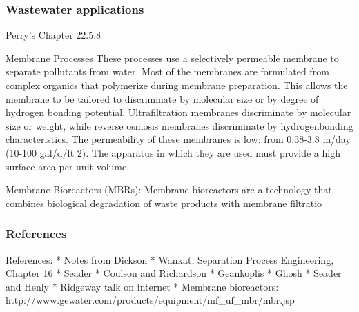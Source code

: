 \begin{frame}\frametitle{Wastewater applications}
	Perry's Chapter 22.5.8
	
	Membrane Processes These processes use a selectively permeable membrane to separate pollutants from water. Most of the membranes are formulated from complex organics that polymerize during membrane preparation. This allows the membrane to be tailored to discriminate by molecular size or by degree of hydrogen bonding potential. Ultrafiltration membranes discriminate by molecular size or weight, while reverse osmosis membranes discriminate by hydrogenbonding characteristics. The permeability of these membranes is low: from 0.38-3.8 m/day (10-100 gal/d/ft 2). The apparatus in which they are used must provide a high surface area per unit volume.

	Membrane Bioreactors (MBRs): Membrane bioreactors are a technology that combines biological degradation of waste products with membrane filtratio
\end{frame}

\begin{frame}\frametitle{References}
	References:
	* Notes from Dickson
	* Wankat, Separation Process Engineering, Chapter 16
	* Seader
	* Coulson and Richardson
	* Geankoplis
	* Ghosh
	* Seader and Henly
	* Ridgeway talk on internet
	* Membrane bioreactors: http://www.gewater.com/products/equipment/mf\_uf\_mbr/mbr.jsp
	
\end{frame}